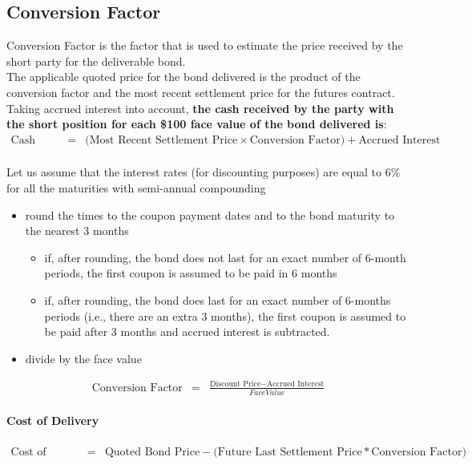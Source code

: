 \subsection{Conversion Factor}
Conversion Factor is the factor that is used to estimate the price received by the short party for the deliverable bond.\\
The applicable quoted price for the bond delivered is the product of the conversion factor and the most recent settlement price for the futures contract.\\
Taking accrued interest into account, \textbf{\color{ForestGreen}the cash received by the party with the short position for each \$100 face value of the bond delivered is}:
\begin{eqnarray}
	\nonumber
	\text{Cash Price} &=& \Big(\text{Most Recent Settlement Price} \times \text{Conversion Factor}\Big) + \text{Accrued Interest}
\end{eqnarray}

\paragraph{}
Let us assume that the interest rates (for discounting purposes) are equal to 6\% for all the maturities with semi-annual compounding
\begin{itemize}
	\item round the times to the coupon payment dates and to the bond maturity to the nearest 3 months
	\begin{itemize}
		\item if, after rounding, the bond does not last for an exact number of 6-month periods, the first coupon is assumed to be paid in 6 months
		\item if, after rounding, the bond does last for an exact number of 6-months periods (i.e., there are an extra 3 months), the first coupon is assumed to be paid after 3 months and accrued interest is subtracted.
	\end{itemize}
	\item divide by the face value
\end{itemize}
\begin{eqnarray}
	\text{Conversion Factor} &=& \frac{\text{Discount Price} - \text{Accrued Interest}}{Face Value}
\end{eqnarray}

\paragraph{Cost of Delivery}
\begin{eqnarray}
	\nonumber
	\text{Cost of Delivery} &=&	\text{Quoted Bond Price} - \Big(\text{Future Last Settlement Price} * \text{Conversion Factor}\Big)
\end{eqnarray}

